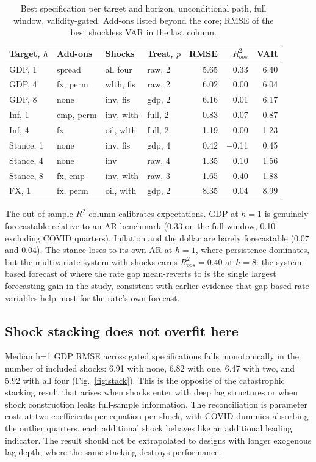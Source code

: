 \documentclass[conference]{IEEEtran}
\begin{document}
\begin{table}[t]
\caption{Best specification per target and horizon, unconditional path, full window, validity-gated. Add-ons listed beyond the core; RMSE of the best shockless VAR in the last column.}
\label{tab:leader}
\centering
\small
\setlength{\tabcolsep}{3.5pt}
\begin{tabular}{@{}llllrrr@{}}
\toprule
Target, $h$ & Add-ons & Shocks & Treat, $p$ & RMSE & $R^2_{oos}$ & VAR \\
\midrule
GDP, 1 & spread & all four & raw, 2 & 5.65 & 0.33 & 6.40 \\
GDP, 4 & fx, perm & wlth, fis & raw, 2 & 6.02 & 0.00 & 6.04 \\
GDP, 8 & none & inv, fis & gdp, 2 & 6.16 & 0.01 & 6.17 \\
Inf, 1 & emp, perm & inv, wlth & full, 2 & 0.83 & 0.07 & 0.87 \\
Inf, 4 & fx & oil, wlth & full, 2 & 1.19 & 0.00 & 1.23 \\
Stance, 1 & none & inv, fis & gdp, 4 & 0.42 & $-$0.11 & 0.45 \\
Stance, 4 & none & inv & raw, 4 & 1.35 & 0.10 & 1.56 \\
Stance, 8 & fx, emp & inv, wlth & raw, 3 & 1.65 & 0.40 & 1.88 \\
FX, 1 & fx, perm & oil, wlth & gdp, 2 & 8.35 & 0.04 & 8.99 \\
\bottomrule
\end{tabular}
\end{table}

The out-of-sample $R^2$ column calibrates expectations. GDP at $h=1$ is genuinely forecastable relative to an AR benchmark (0.33 on the full window, 0.10 excluding COVID quarters). Inflation and the dollar are barely forecastable (0.07 and 0.04). The stance loses to its own AR at $h=1$, where persistence dominates, but the multivariate system with shocks earns $R^2_{oos}=0.40$ at $h=8$: the system-based forecast of where the rate gap mean-reverts to is the single largest forecasting gain in the study, consistent with earlier evidence that gap-based rate variables help most for the rate's own forecast.

\subsection{Shock stacking does not overfit here}
Median h=1 GDP RMSE across gated specifications falls monotonically in the number of included shocks: 6.91 with none, 6.82 with one, 6.47 with two, and 5.92 with all four (Fig.~\ref{fig:stack}). This is the opposite of the catastrophic stacking result that arises when shocks enter with deep lag structures or when shock construction leaks full-sample information. The reconciliation is parameter cost: at two coefficients per equation per shock, with COVID dummies absorbing the outlier quarters, each additional shock behaves like an additional leading indicator. The result should not be extrapolated to designs with longer exogenous lag depth, where the same stacking destroys performance.
\end{document}
